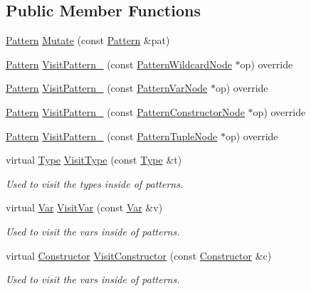 \subsection*{Public Member Functions}
\begin{DoxyCompactItemize}
\item 
\hyperlink{classtvm_1_1relay_1_1Pattern}{Pattern} \hyperlink{classtvm_1_1relay_1_1PatternMutator_afd5ae4d9caeaae89c339e1377962b51f}{Mutate} (const \hyperlink{classtvm_1_1relay_1_1Pattern}{Pattern} \&pat)
\item 
\hyperlink{classtvm_1_1relay_1_1Pattern}{Pattern} \hyperlink{classtvm_1_1relay_1_1PatternMutator_aedeb370baf4bca6018153d01d2594a84}{Visit\+Pattern\+\_\+} (const \hyperlink{classtvm_1_1relay_1_1PatternWildcardNode}{Pattern\+Wildcard\+Node} $\ast$op) override
\item 
\hyperlink{classtvm_1_1relay_1_1Pattern}{Pattern} \hyperlink{classtvm_1_1relay_1_1PatternMutator_a45f7cdfa9d72a3ab0ce2cb4ea04fec5b}{Visit\+Pattern\+\_\+} (const \hyperlink{classtvm_1_1relay_1_1PatternVarNode}{Pattern\+Var\+Node} $\ast$op) override
\item 
\hyperlink{classtvm_1_1relay_1_1Pattern}{Pattern} \hyperlink{classtvm_1_1relay_1_1PatternMutator_a5c4cdc5bd1b1929edf9afa3cf85b9857}{Visit\+Pattern\+\_\+} (const \hyperlink{classtvm_1_1relay_1_1PatternConstructorNode}{Pattern\+Constructor\+Node} $\ast$op) override
\item 
\hyperlink{classtvm_1_1relay_1_1Pattern}{Pattern} \hyperlink{classtvm_1_1relay_1_1PatternMutator_af8ea941a20a51cba2dc5e9e21f0ffc88}{Visit\+Pattern\+\_\+} (const \hyperlink{classtvm_1_1relay_1_1PatternTupleNode}{Pattern\+Tuple\+Node} $\ast$op) override
\item 
virtual \hyperlink{namespacetvm_1_1relay_a661d95f170bca230773914caeef3fe52}{Type} \hyperlink{classtvm_1_1relay_1_1PatternMutator_a2ec9a680c63665b3c6087b67c638dce7}{Visit\+Type} (const \hyperlink{namespacetvm_1_1relay_a661d95f170bca230773914caeef3fe52}{Type} \&t)
\begin{DoxyCompactList}\small\item\em Used to visit the types inside of patterns. \end{DoxyCompactList}\item 
virtual \hyperlink{classtvm_1_1relay_1_1Var}{Var} \hyperlink{classtvm_1_1relay_1_1PatternMutator_a8e3887d5d34d9c2df16743492d3c3e7d}{Visit\+Var} (const \hyperlink{classtvm_1_1relay_1_1Var}{Var} \&v)
\begin{DoxyCompactList}\small\item\em Used to visit the vars inside of patterns. \end{DoxyCompactList}\item 
virtual \hyperlink{namespacetvm_1_1relay_aec85bf097deda59bd22e88475c9165e9}{Constructor} \hyperlink{classtvm_1_1relay_1_1PatternMutator_a03cf1d4afb8443e2f1decb4512d7c4ad}{Visit\+Constructor} (const \hyperlink{namespacetvm_1_1relay_aec85bf097deda59bd22e88475c9165e9}{Constructor} \&c)
\begin{DoxyCompactList}\small\item\em Used to visit the vars inside of patterns. \end{DoxyCompactList}\end{DoxyCompactItemize}


